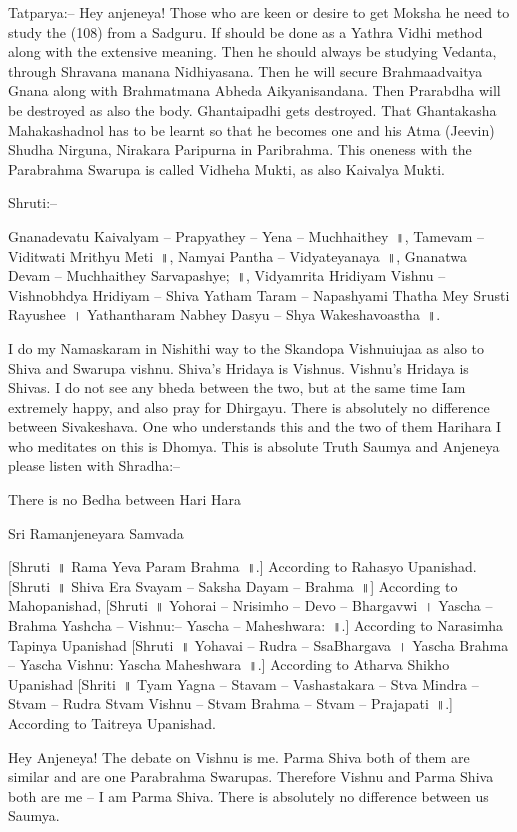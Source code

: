 Tatparya:– Hey anjeneya! Those who are keen or desire to get Moksha he need to study the (108) from a Sadguru. If should be done as a Yathra Vidhi method along with the extensive meaning. Then he should always be studying Vedanta, through Shravana manana Nidhiyasana. Then he will secure Brahmaadvaitya Gnana along with Brahmatmana Abheda Aikyanisandana. Then Prarabdha will be destroyed as also the body. Ghantaipadhi gets destroyed. That Ghantakasha Mahakashadnol has to be learnt so that he becomes one and his Atma (Jeevin) Shudha Nirguna, Nirakara Paripurna in Paribrahma. This oneness with the Parabrahma Swarupa is called Vidheha Mukti, as also Kaivalya Mukti.

Shruti:–

Gnanadevatu Kaivalyam – Prapyathey – Yena – Muchhaithey~॥, Tamevam – Viditwati Mrithyu Meti~॥, Namyai Pantha – Vidyateyanaya~॥, Gnanatwa Devam – Muchhaithey Sarvapashye;~॥, Vidyamrita Hridiyam Vishnu – Vishnobhdya Hridiyam – Shiva Yatham Taram – Napashyami Thatha Mey Srusti Rayushee~। Yathantharam Nabhey Dasyu – Shya Wakeshavoastha~॥.

I do my Namaskaram in Nishithi way to the Skandopa Vishnuiujaa as also to Shiva and Swarupa vishnu. Shiva's Hridaya is Vishnus. Vishnu's Hridaya is Shivas. I do not see any bheda between the two, but at the same time Iam extremely happy, and also pray for Dhirgayu. There is absolutely no difference between Sivakeshava. One who understands this and the two of them Harihara I who meditates on this is Dhomya. This is absolute Truth Saumya and Anjeneya please listen with Shradha:–

There is no Bedha between Hari Hara

Sri Ramanjeneyara Samvada

[Shruti~॥ Rama Yeva Param Brahma~॥.] According to Rahasyo Upanishad. [Shruti~॥ Shiva Era Svayam – Saksha Dayam – Brahma~॥] According to Mahopanishad, [Shruti~॥ Yohorai – Nrisimho – Devo – Bhargavwi~। Yascha – Brahma Yashcha – Vishnu:– Yascha – Maheshwara:~॥.] According to Narasimha Tapinya Upanishad [Shruti~॥ Yohavai – Rudra – SsaBhargava~। Yascha Brahma – Yascha Vishnu: Yascha Maheshwara~॥.] According to Atharva Shikho Upanishad [Shriti~॥ Tyam Yagna – Stavam – Vashastakara – Stva Mindra – Stvam – Rudra Stvam Vishnu – Stvam Brahma – Stvam – Prajapati~॥.] According to Taitreya Upanishad.

Hey Anjeneya! The debate on Vishnu is me. Parma Shiva both of them are similar and are one Parabrahma Swarupas. Therefore Vishnu and Parma Shiva both are me – I am Parma Shiva. There is absolutely no difference between us Saumya. 

